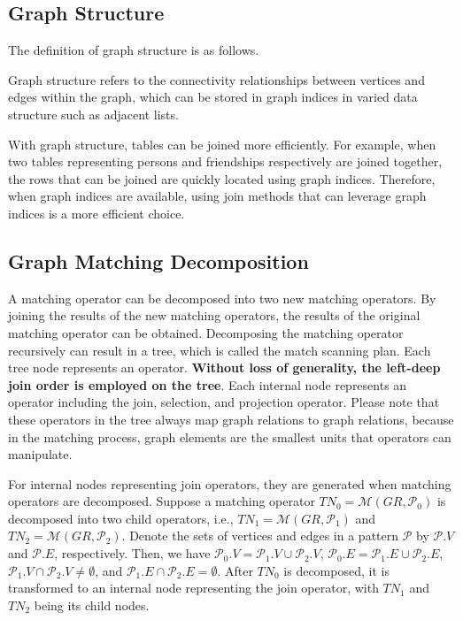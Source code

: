 \subsection{Graph Structure}

The definition of graph structure is as follows.

\begin{definition}
    Graph structure refers to the connectivity relationships between vertices and edges within the graph, which can be stored in graph indices in varied data structure such as adjacent lists.
\end{definition}

With graph structure, tables can be joined more efficiently.
For example, when two tables representing persons and friendships respectively are joined together, the rows that can be joined are quickly located using graph indices.
Therefore, when graph indices are available, using join methods that can leverage graph indices is a more efficient choice.

\subsection{Graph Matching Decomposition}

A matching operator can be decomposed into two new matching operators.
By joining the results of the new matching operators, the results of the original matching operator can be obtained.
Decomposing the matching operator recursively can result in a tree, which is called the match scanning plan.
Each tree node represents an operator.
\textbf{Without loss of generality, the left-deep join order is employed on the tree}.
Each internal node represents an operator including the join, selection, and projection operator.
Please note that these operators in the tree always map graph relations to graph relations, because in the matching process, graph elements are the smallest units that operators can manipulate.

For internal nodes representing join operators, they are generated when matching operators are decomposed.
Suppose a matching operator $TN_0 = \mathcal{M}(GR, \mathcal{P}_0)$ is decomposed into two child operators, i.e., $TN_1 = \mathcal{M}(GR, \mathcal{P}_1)$ and $TN_2 = \mathcal{M}(GR, \mathcal{P}_2)$.
Denote the sets of vertices and edges in a pattern $\mathcal{P}$ by $\mathcal{P}.V$ and $\mathcal{P}.E$, respectively.
Then, we have $\mathcal{P}_0.V = \mathcal{P}_1.V \cup \mathcal{P}_2.V$, $\mathcal{P}_0.E = \mathcal{P}_1.E \cup \mathcal{P}_2.E$, $\mathcal{P}_1.V \cap \mathcal{P}_2.V \neq \emptyset$, and $\mathcal{P}_1.E \cap \mathcal{P}_2.E = \emptyset$.
After $TN_0$ is decomposed, it is transformed to an internal node representing the join operator, with $TN_1$ and $TN_2$ being its child nodes.


